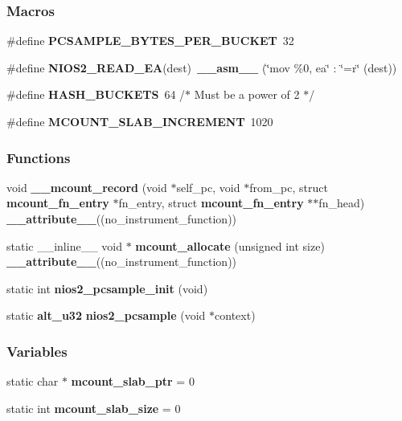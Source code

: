 \subsubsection*{Macros}
\begin{DoxyCompactItemize}
\item 
\#define {\bf P\+C\+S\+A\+M\+P\+L\+E\+\_\+\+B\+Y\+T\+E\+S\+\_\+\+P\+E\+R\+\_\+\+B\+U\+C\+K\+ET}~32
\item 
\#define {\bf N\+I\+O\+S2\+\_\+\+R\+E\+A\+D\+\_\+\+EA}(dest)~{\bf \+\_\+\+\_\+asm\+\_\+\+\_\+} (\char`\"{}mov \%0, ea\char`\"{} \+: \char`\"{}=r\char`\"{} (dest))
\item 
\#define {\bf H\+A\+S\+H\+\_\+\+B\+U\+C\+K\+E\+TS}~64 /$\ast$ Must be a power of 2 $\ast$/
\item 
\#define {\bf M\+C\+O\+U\+N\+T\+\_\+\+S\+L\+A\+B\+\_\+\+I\+N\+C\+R\+E\+M\+E\+NT}~1020
\end{DoxyCompactItemize}
\subsubsection*{Functions}
\begin{DoxyCompactItemize}
\item 
void {\bf \+\_\+\+\_\+mcount\+\_\+record} (void $\ast$self\+\_\+pc, void $\ast$from\+\_\+pc, struct {\bf mcount\+\_\+fn\+\_\+entry} $\ast$fn\+\_\+entry, struct {\bf mcount\+\_\+fn\+\_\+entry} $\ast$$\ast$fn\+\_\+head) {\bf \+\_\+\+\_\+attribute\+\_\+\+\_\+}((no\+\_\+instrument\+\_\+function))
\item 
static \+\_\+\+\_\+inline\+\_\+\+\_\+ void $\ast$ {\bf mcount\+\_\+allocate} (unsigned int size) {\bf \+\_\+\+\_\+attribute\+\_\+\+\_\+}((no\+\_\+instrument\+\_\+function))
\item 
static int {\bf nios2\+\_\+pcsample\+\_\+init} (void)
\item 
static {\bf alt\+\_\+u32} {\bf nios2\+\_\+pcsample} (void $\ast$context)
\end{DoxyCompactItemize}
\subsubsection*{Variables}
\begin{DoxyCompactItemize}
\item 
static char $\ast$ {\bf mcount\+\_\+slab\+\_\+ptr} = 0
\item 
static int {\bf mcount\+\_\+slab\+\_\+size} = 0
\end{DoxyCompactItemize}



